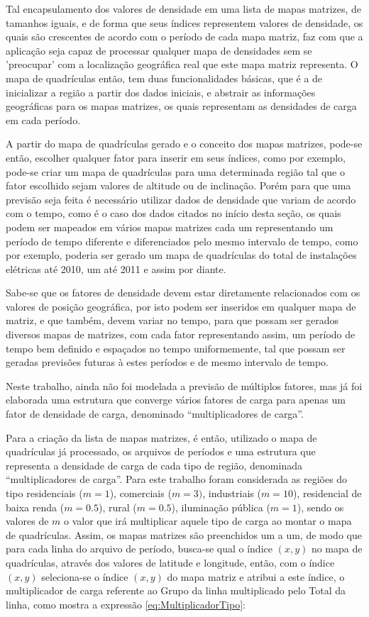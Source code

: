 Tal encapsulamento dos valores de densidade em uma lista de mapas matrizes, de tamanhos iguais, e de forma que seus índices representem valores de densidade, os quais são crescentes de acordo com o período de cada mapa matriz, faz com que a aplicação seja capaz de processar qualquer mapa de densidades sem se 'preocupar' com a localização geográfica real que este mapa matriz representa. O mapa de quadrículas então, tem duas funcionalidades básicas, que é a de inicializar a região a partir dos dados iniciais, e abstrair as informações geográficas para os mapas matrizes, os quais representam as densidades de carga em cada período.

A partir do mapa de quadrículas gerado e o conceito dos mapas matrizes, pode-se então, escolher qualquer fator para inserir em seus índices, como por exemplo, pode-se criar um mapa de quadrículas para uma determinada região tal que o fator escolhido sejam valores de altitude ou de inclinação. Porém para que uma previsão seja feita é necessário utilizar dados de densidade que variam de acordo com o tempo, como é o caso dos dados citados no início desta seção, os quais podem ser mapeados em vários mapas matrizes cada um representando um período de tempo diferente e diferenciados pelo mesmo intervalo de tempo, como por exemplo, poderia ser gerado um mapa de quadrículas do total de instalações elétricas até 2010, um até 2011 e assim por diante.

Sabe-se que os fatores de densidade devem estar diretamente relacionados com os valores de posição geográfica, por isto podem ser inseridos em qualquer mapa de matriz, e que também, devem variar no tempo, para que possam ser gerados diversos mapas de matrizes, com cada fator representando assim, um período de tempo bem definido e espaçados no tempo uniformemente, tal que possam ser geradas previsões futuras à estes períodos e de mesmo intervalo de tempo.

	Neste trabalho, ainda não foi modelada a previsão de múltiplos fatores, mas já foi elaborada uma estrutura que converge vários fatores de carga para apenas um fator de densidade de carga, denominado “multiplicadores de carga”.

Para a criação da lista de mapas matrizes, é então, utilizado o mapa de quadrículas já processado, os arquivos de períodos e uma estrutura que representa a densidade de carga de cada tipo de região, denominada “multiplicadores de carga”. Para este trabalho foram considerada as regiões do tipo residenciais (\(m=1\)), comerciais (\(m=3)\), industriais (\(m=10\)), residencial de baixa renda (\(m=0.5\)), rural (\(m=0.5\)), iluminação pública (\(m=1\)), sendo os valores de \(m\) o valor que irá multiplicar aquele tipo de carga ao montar o mapa de quadrículas. Assim, os mapas matrizes são preenchidos um a um, de modo que para cada linha do arquivo de período, busca-se qual o índice \((x,y)\) no mapa de quadrículas, através dos valores de latitude e longitude, então, com o índice \((x,y)\) seleciona-se o índice \((x,y)\) do mapa matriz e atribui a este índice, o multiplicador de carga referente ao Grupo da linha multiplicado pelo Total da linha, como mostra a expressão \ref{eq:MultiplicadorTipo}:

